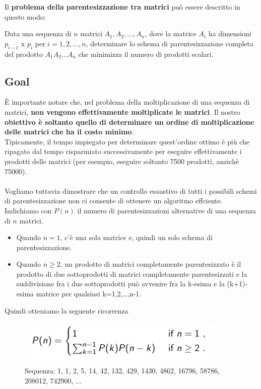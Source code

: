 Il \textbf{problema della parentesizzazione tra matrici} può essere
descritto in questo modo:
\begin{myblockquote}
  Data una sequenza di $n$
  matrici $A_1, A_2, \ldots, A_n$, dove la matrice $A_i$ ha dimensioni
  $p_{i-1}$ x $p_i$ per $i = 1,2, \ldots,n$, determinare lo schema di
  parentesizzazione completa del prodotto $A_1A_2 \ldots A_n$ che minimizza
  il numero di prodotti scalari.
\end{myblockquote}


\subsection{Goal}

È importante notare che, nel problema della moltiplicazione di una
sequenza di matrici, \textbf{non vengono effettivamente moltiplicate le
  matrici}. Il nostro \textbf{obiettivo è soltanto quello di determinare
  un ordine di moltiplicazione delle matrici che ha il costo minimo}.\\
Tipicamente, il tempo impiegato per determinare quest'ordine ottimo è
più che ripagato dal tempo risparmiato successivamente per eseguire
effettivamente i prodotti delle matrici (per esempio, eseguire soltanto
7500 prodotti, anzichè 75000).\\
\\
Vogliamo tuttavia dimostrare che un controllo esaustivo di tutti i
possibili schemi di parentesizzazione non ci consente di ottenere un
algoritmo effciente. Indichiamo con $P(n)$ il numero di
parentesizzazioni alternative di una sequenza di $n$ matrici.
\begin{itemize}
  \item Quando
        $n=1$, c'è una sola matrice e, quindi un solo schema di
        parentesizzazione.
  \item Quando $n \ge 2$, un prodotto di matrici
        completamente parentesizzato è il prodotto di due sottoprodotti di
        matrici completamente parentesizzati e la suddivisione fra i due
        sottoprodotti può avvenire fra la k-esima e la (k+1)-esima matrice per
        qualsiasi k=1,2,\ldots,n-1.
\end{itemize}

Quindi otteniamo la seguente ricorrenza

\begin{figure}[H]
\centering
  \includegraphics[width=10cm, keepaspectratio]{Programmazione_dinamica/imgs/matrix1.png}
  \caption{Sequenza: 1, 1, 2, 5, 14, 42, 132, 429, 1430, 4862, 16796, 58786, 208012, 742900,
$\ldots$}
\end{figure}

